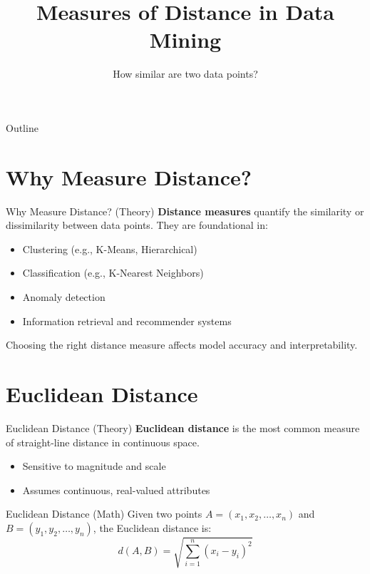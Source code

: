 \documentclass{beamer}
\title{Measures of Distance in Data Mining }
\subtitle{How similar are two data points?}
\date{}
\begin{document}
{
\begin{frame}
    \titlepage
\end{frame}
}
\begin{frame}{Outline}
    \tableofcontents
\end{frame}


\section{Why Measure Distance?}
\begin{frame}{Why Measure Distance? (Theory)}
\textbf{Distance measures} quantify the similarity or dissimilarity between data points. They are foundational in:
\begin{itemize}
    \item Clustering (e.g., K-Means, Hierarchical)
    \item Classification (e.g., K-Nearest Neighbors)
    \item Anomaly detection
    \item Information retrieval and recommender systems
\end{itemize}
Choosing the right distance measure affects model accuracy and interpretability.
\end{frame}

\section{Euclidean Distance}
\begin{frame}{Euclidean Distance (Theory)}
\textbf{Euclidean distance} is the most common measure of straight-line distance in continuous space.
\begin{itemize}
    \item Sensitive to magnitude and scale
    \item Assumes continuous, real-valued attributes
\end{itemize}
\end{frame}

\begin{frame}{Euclidean Distance (Math)}
Given two points \( A = (x_1, x_2, \dots, x_n) \) and \( B = (y_1, y_2, \dots, y_n) \), the Euclidean distance is:
\[
d(A, B) = \sqrt{\sum_{i=1}^{n}(x_i - y_i)^2}
\]
\end{frame}
\end{document}

